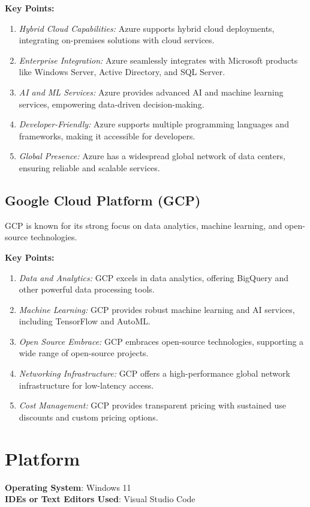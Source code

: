 \documentclass[11pt]{article}
\begin{document}
\textbf{Key Points:}
\begin{enumerate}
    \item \textit{Hybrid Cloud Capabilities:} Azure supports hybrid cloud deployments, integrating on-premises solutions with cloud services.
    \item \textit{Enterprise Integration:} Azure seamlessly integrates with Microsoft products like Windows Server, Active Directory, and SQL Server.
    \item \textit{AI and ML Services:} Azure provides advanced AI and machine learning services, empowering data-driven decision-making.
    \item \textit{Developer-Friendly:} Azure supports multiple programming languages and frameworks, making it accessible for developers.
    \item \textit{Global Presence:} Azure has a widespread global network of data centers, ensuring reliable and scalable services.
\end{enumerate}

\subsection{Google Cloud Platform (GCP)}
GCP is known for its strong focus on data analytics, machine learning, and open-source technologies.

\textbf{Key Points:}
\begin{enumerate}
    \item \textit{Data and Analytics:} GCP excels in data analytics, offering BigQuery and other powerful data processing tools.
    \item \textit{Machine Learning:} GCP provides robust machine learning and AI services, including TensorFlow and AutoML.
    \item \textit{Open Source Embrace:} GCP embraces open-source technologies, supporting a wide range of open-source projects.
    \item \textit{Networking Infrastructure:} GCP offers a high-performance global network infrastructure for low-latency access.
    \item \textit{Cost Management:} GCP provides transparent pricing with sustained use discounts and custom pricing options.
\end{enumerate}


\section{Platform}
\textbf{Operating System}: Windows 11 \\
\textbf{IDEs or Text Editors Used}: Visual Studio Code\\
\end{document}
